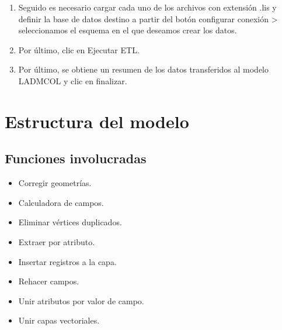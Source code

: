 \documentclass[letterpaper,10pt,spanish]{sphinxmanual}
\begin{document}
\begin{enumerate}
\item {} 
Seguido es necesario cargar cada uno de los archivos con extensión .lis y definir la base de datos destino a partir del botón configurar conexión \sphinxhyphen{}\textgreater{} seleccionamos el esquema en el que deseamos crear los datos.

\item {} 
Por último, clic en Ejecutar ETL.


\item {} 
Por último, se obtiene un resumen de los datos transferidos al modelo LADM\sphinxhyphen{}COL y clic en finalizar.


\end{enumerate}


\section{Estructura del modelo}
\label{\detokenize{ETL_Cobol/Model:estructura-del-modelo}}\label{\detokenize{ETL_Cobol/Model::doc}}

\subsection{Funciones involucradas}
\label{\detokenize{ETL_Cobol/Model:funciones-involucradas}}\begin{itemize}
\item {} 
Corregir geometrías.

\item {} 
Calculadora de campos.

\item {} 
Eliminar vértices duplicados.

\item {} 
Extraer por atributo.

\item {} 
Insertar registros a la capa.

\item {} 
Rehacer campos.

\item {} 
Unir atributos por valor de campo.

\item {} 
Unir capas vectoriales.

\end{itemize}
\end{document}
